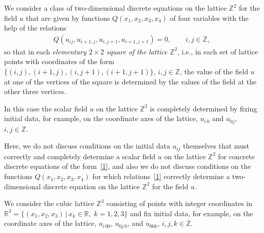\documentclass[pdftex]{sigma}
\begin{document}
We consider a class of two-dimensional discrete equations on the
lattice $\mathbb{Z}^2$ for the f\/ield $u$ that are given by functions
$Q (x_1, x_2, x_3, x_4)$ of four variables with the help of the
relations
\begin{gather} Q (u_{i j}, u_{i + 1, j}, u_{i, j + 1}, u_{i + 1, j +
1}) = 0, \qquad i, j \in \mathbb{Z}, \label{1}
\end{gather}
so that in each
{\it elementary $2 \times 2$ square of the lattice $\mathbb{Z}^2$},
i.e., in each set of lattice points with coordinates of the form
$\{(i, j), (i + 1, j), (i, j + 1), (i + 1, j + 1)\}$, $i, j \in
\mathbb{Z}$, the value of the f\/ield $u$ at one of the vertices of
the square is determined by the values of the f\/ield at the other
three vertices.




In this case the scalar f\/ield $u$ on the lattice $\mathbb{Z}^2$ is
completely determined by f\/ixing initial data, for example, on the
coordinate axes of the lattice, $u_{i \, 0}$ and $u_{ 0 j}$, $i, j
\in \mathbb{Z}$.







Here, we do not discuss conditions on the initial data $u_{i j}$
themselves that must correctly and completely determine a scalar
f\/ield $u$ on the lattice $\mathbb{Z}^2$ for concrete discrete
equations of the form~\eqref{1}, and also we do not discuss
conditions on the functions $Q (x_1, x_2, x_3, x_4)$ for which
relations~\eqref{1} correctly determine a two-dimensional discrete
equation on the lattice $\mathbb{Z}^2$ for the f\/ield $u$.






We consider the cubic lattice $\mathbb{Z}^3$ consisting of points
with integer coordinates in $\mathbb{R}^3 = \{ (x_1, x_2, x_3)\,|\, x_k
\in \mathbb{R},\;  k =1, 2, 3 \}$ and f\/ix initial data, for example,
on the coordinate axes of the lattice, $u_{i\, 0 0}$, $u_{ 0 j\,
0}$, and $u_{ 0 0 k}$, $i, j, k \in \mathbb{Z}$.
\end{document}
